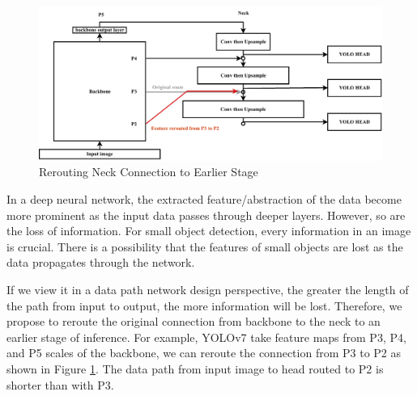   \begin{figure}
    \centering
    \includegraphics[width=.9\textwidth]{figures/neck-move-back.pdf}
    \caption{Rerouting Neck Connection to Earlier Stage}
    \label{fig:neckmoveback}
  \end{figure}
  In a deep neural network, the extracted feature/abstraction of the data become more prominent
  as the input data passes through deeper layers. However, so are the loss of information. 
  For small object detection, every information in an image is crucial. 
  There is a possibility that the features of small objects are lost as the data propagates through the network.
  
  If we view it in a data path network design perspective, the greater the length of the path from input
  to output, the more information will be lost. Therefore, we propose to reroute the original connection from
  backbone to the neck to an earlier stage of inference. For example, YOLOv7 take feature maps from P3, P4, and P5
  scales of the backbone, we can reroute the connection from P3 to P2 as shown in Figure \ref{fig:neckmoveback}.
  The data path from input image to head routed to P2 is shorter than with P3.
